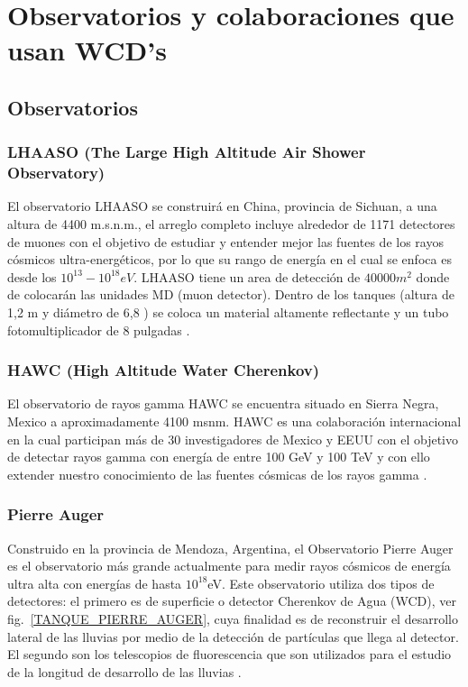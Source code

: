 \chapter{Observatorios y colaboraciones que usan WCD's}\label{OBSERVATORIOS_COLABORACIONES}
\section{Observatorios}
	\subsection{LHAASO (The Large High Altitude Air Shower Observatory)}\label{LHAASO}
	El observatorio LHAASO se construirá en China, provincia de Sichuan, a una altura de 4400 m.s.n.m., el arreglo completo incluye alrededor de 1171 detectores de muones con el objetivo de estudiar y entender mejor las fuentes de los rayos cósmicos ultra-energéticos, por lo que su rango de energía en el cual se enfoca es desde los $10^{13}-10^{18} eV$. LHAASO tiene un area de detección de $40000 m^{2}$ donde de colocarán las unidades MD (muon detector). Dentro de los tanques (altura de 1,2 m y diámetro de 6,8 ) se coloca un material altamente reflectante y un tubo fotomultiplicador de 8 pulgadas \cite{ZUO20181}.
	
	\subsection{HAWC (High Altitude Water Cherenkov)}\label{HAWC}
	El observatorio de rayos gamma HAWC se encuentra situado en Sierra Negra, Mexico a aproximadamente 4100 msnm. HAWC es una colaboración internacional en la cual participan más de 30 investigadores de Mexico y EEUU con el objetivo de detectar rayos gamma con energía de entre 100 GeV y 100 TeV y con ello extender nuestro conocimiento de las fuentes cósmicas de los rayos gamma \cite{Bonilla}.
	
	\subsection{Pierre Auger}\label{PIERRE_AUGER}
	Construido en la provincia de Mendoza, Argentina, el Observatorio Pierre Auger es el observatorio más grande actualmente para medir rayos cósmicos de energía ultra alta con energías de hasta $10^{18} $eV. Este observatorio utiliza dos tipos de detectores: el primero es de superficie o detector Cherenkov de Agua (WCD), ver fig.~\ref{TANQUE_PIERRE_AUGER}, cuya finalidad es de reconstruir el desarrollo lateral de las lluvias por medio de la detección de partículas que llega al detector. El segundo son los telescopios de fluorescencia que son utilizados para el estudio de la longitud de desarrollo de las lluvias \cite{A.C.Cobos}.

